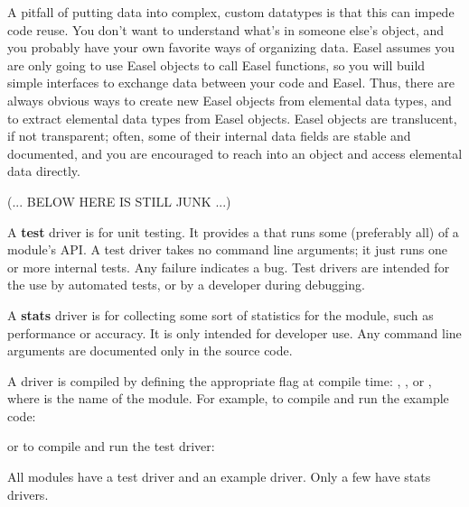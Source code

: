 A pitfall of putting data into complex, custom datatypes is that this
can impede code reuse. You don't want to understand what's in someone
else's object, and you probably have your own favorite ways of
organizing data.  Easel assumes you are only going to use Easel
objects to call Easel functions, so you will build simple interfaces
to exchange data between your code and Easel. Thus, there are always
obvious ways to create new Easel objects from elemental data types,
and to extract elemental data types from Easel objects. Easel objects
are translucent, if not transparent; often, some of their internal
data fields are stable and documented, and you are encouraged to reach
into an object and access elemental data directly.





(... BELOW HERE IS STILL JUNK ...)


A \textbf{test} driver is for unit testing. It provides a
 that runs some (preferably all) of a module's API. A
test driver takes no command line arguments; it just runs one or more
internal tests. Any failure indicates a bug. Test drivers are intended
for the use by automated tests, or by a developer during debugging.

A \textbf{stats} driver is for collecting some sort of statistics for
the module, such as performance or accuracy. It is only intended for
developer use. Any command line arguments are documented only in the
source code.

A driver is compiled by defining the appropriate flag at compile time:
, , or
, where  is the name of the
module. For example, to compile and run the  example
code:

\begin{cchunk}
\end{cchunk}

or to compile and run the  test driver:

\begin{cchunk}
\end{cchunk}

All modules have a test driver and an example driver. Only a few have
stats drivers.



